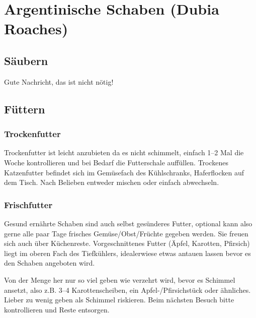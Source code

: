 \chapter{Argentinische Schaben (Dubia Roaches)}

\section{Säubern}
Gute Nachricht, das ist nicht nötig!

\section{Füttern}

\subsection{Trockenfutter}
Trockenfutter ist leicht anzubieten da es nicht schimmelt, einfach 1--2 Mal die Woche kontrollieren
und bei Bedarf die Futterschale auffüllen.
Trockenes Katzenfutter befindet sich im Gemüsefach des Kühlschranks, Haferflocken auf dem Tisch.
Nach Belieben entweder mischen oder einfach abwechseln.

\subsection{Frischfutter}
Gesund ernährte Schaben sind auch selbst gesünderes Futter, optional kann also gerne alle paar Tage
frisches Gemüse/Obst/Früchte gegeben werden. Sie freuen sich auch über Küchenreste.
Vorgeschnittenes Futter (Äpfel, Karotten, Pfirsich) liegt im oberen Fach des Tiefkühlers,
idealerwiese etwas antauen lassen bevor es den Schaben angeboten wird.

Von der Menge her nur so viel geben wie verzehrt wird, bevor es Schimmel ansetzt,
also z.B. 3--4 Karottenscheiben, ein Apfel-/Pfirsichstück oder ähnliches.
Lieber zu wenig geben als Schimmel riskieren.
Beim nächsten Besuch bitte kontrollieren und Reste entsorgen.

